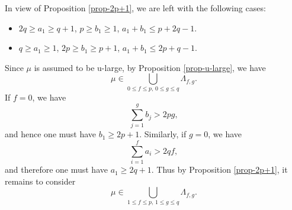 \documentclass[11pt]{amsart}
\theoremstyle{plain}
\theoremstyle{definition}
\begin{document}
In view of Proposition \ref{prop-2p+1}, we are left with the following cases:
\begin{itemize}
	\item[($\partial L$)] $2q\ge a_1\ge q+1$, $p\ge b_1\ge 1$, $a_1+b_1\le p+2q-1$.
	\item[($\partial R$)] $q\ge a_1\ge 1$, $2p\ge b_1\ge p+1$, $a_1+b_1\le 2p+q-1$.
\end{itemize}

Since $\mu$ is assumed to be u-large, by Proposition \ref{prop-u-large}, we have
$$
\mu\in\bigcup_{0\leq f\leq p, \, 0\leq g\leq q} \Lambda_{f, g}.
$$
If $f=0$, we have
\[\sum_{j=1}^g b_j>2pg,\]
and hence one must have $b_1\ge 2p+1$. Similarly, if $g=0$, we have
\[\sum_{i=1}^f a_i>2qf,\]
and therefore one must have $a_1\ge 2q+1$. Thus by Proposition \ref{prop-2p+1}, it remains to consider
$$
\mu\in\bigcup_{1\leq f\leq p, \, 1\leq g\leq q} \Lambda_{f, g}.
$$
\end{document}
